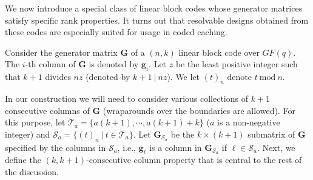 \documentclass[journal,twocolumn]{IEEEtran}
\theoremstyle{definition}
\newcommand{\calS}{\mathcal{S}}
\newcommand{\calT}{\mathcal{T}}
\newcommand{\bfg}{\mathbf{g}}
\newcommand{\bfG}{\mathbf{G}}
\newcommand{\litang}[1]{\marginpar{+}{\bf Li's remark}: {\em #1}}
\begin{document}
We now introduce a special class of linear block codes whose generator matrices satisfy specific rank properties. It turns out that resolvable designs obtained from these codes are especially suited for usage in coded caching.

Consider the generator matrix $\bfG$ of a $(n,k)$ linear block code over $GF(q)$. %
 The $i$-th column of $\bfG$ is denoted by $\bfg_i$.
Let $z$ be the least positive integer such that $k+1$ divides $nz$ (denoted by $k+1~|~nz$). We let $(t)_n$ denote $t~\text{mod}~n$.

In our construction we will need to consider various collections of $k+1$ consecutive columns of $\bfG$ (wraparounds over the boundaries are allowed). For this purpose, let $\calT_a=\{a(k+1),\cdots, a(k+1)+k\}$  ($a$ is a non-negative integer) and $\calS_a= \{(t)_n~|~t\in \calT_a \}$. Let $\bfG_{\calS_a}$ be the $k \times (k+1)$ submatrix of $\bfG$ specified by the columns in $\calS_a$, i.e.,  $\bfg_{\ell}$ is a column in  $\bfG_{\calS_a}$ if $\ell \in \calS_a$.
Next, we define the $(k,k+1)$-consecutive column property that is central to the rest of the discussion.
\end{document}

